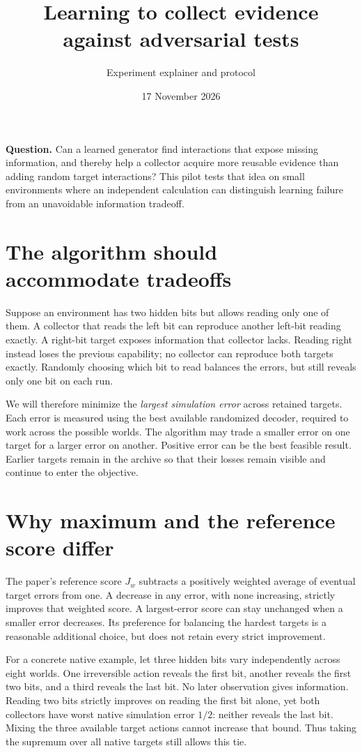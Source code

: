 \documentclass[11pt]{article}
\title{Learning to collect evidence against adversarial tests}
\author{Experiment explainer and protocol}
\date{17 November 2026}
\begin{document}
\maketitle

\textbf{Question.} Can a learned generator find interactions that expose missing
information, and thereby help a collector acquire more reusable evidence than
adding random target interactions? This pilot tests that idea on small environments
where an independent calculation can distinguish learning failure from an
unavoidable information tradeoff.

\section{The algorithm should accommodate tradeoffs}
Suppose an environment has two hidden bits but allows reading only one of them.
A collector that reads the left bit can reproduce another left-bit reading
exactly. A right-bit target exposes information that collector lacks. Reading
right instead loses the previous capability; no collector can reproduce both
targets exactly. Randomly choosing which bit to read balances the errors, but
still reveals only one bit on each run.

We will therefore minimize the \emph{largest simulation error} across retained
targets. Each error is measured using the best available randomized decoder,
required to work across the possible worlds. The algorithm may trade a smaller
error on one target for a larger error on another. Positive error can be the best
feasible result. Earlier targets remain in the archive so that their losses
remain visible and continue to enter the objective.

\section{Why maximum and the reference score differ}
The paper's reference score $J_w$ subtracts a positively weighted average of
eventual target errors from one. A decrease in any error, with none increasing,
strictly improves that weighted score. A largest-error score can stay unchanged
when a smaller error decreases. Its preference for balancing the hardest targets
is a reasonable additional choice, but does not retain every strict improvement.

For a concrete native example, let three hidden bits vary independently across
eight worlds. One irreversible action reveals the first bit, another reveals
the first two bits, and a third reveals the last bit. No later observation gives
information. Reading two bits strictly improves on reading the first bit alone,
yet both collectors have worst native simulation error $1/2$: neither reveals
the last bit. Mixing the three available target actions cannot increase that
bound. Thus taking the supremum over all native targets still allows this tie.
\end{document}
